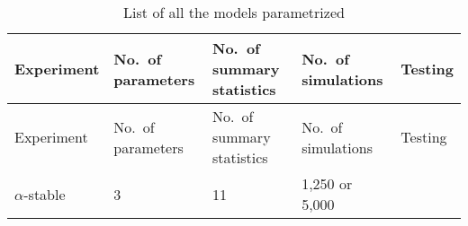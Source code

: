 \documentclass[]{article}
\begin{document}
\begin{longtable}[]{@{}lllll@{}}
\caption{\label{tab:experimentsmasterlist} List of all the models parametrized}\tabularnewline
\toprule
\begin{minipage}[b]{0.20\columnwidth}\raggedright
Experiment\strut
\end{minipage} & \begin{minipage}[b]{0.15\columnwidth}\raggedright
No.~of parameters\strut
\end{minipage} & \begin{minipage}[b]{0.21\columnwidth}\raggedright
No.~of summary statistics\strut
\end{minipage} & \begin{minipage}[b]{0.15\columnwidth}\raggedright
No.~of simulations\strut
\end{minipage} & \begin{minipage}[b]{0.15\columnwidth}\raggedright
Testing\strut
\end{minipage}\tabularnewline
\midrule
\endfirsthead
\toprule
\begin{minipage}[b]{0.20\columnwidth}\raggedright
Experiment\strut
\end{minipage} & \begin{minipage}[b]{0.15\columnwidth}\raggedright
No.~of parameters\strut
\end{minipage} & \begin{minipage}[b]{0.21\columnwidth}\raggedright
No.~of summary statistics\strut
\end{minipage} & \begin{minipage}[b]{0.15\columnwidth}\raggedright
No.~of simulations\strut
\end{minipage} & \begin{minipage}[b]{0.15\columnwidth}\raggedright
Testing\strut
\end{minipage}\tabularnewline
\midrule
\endhead
\begin{minipage}[t]{0.20\columnwidth}\raggedright
\(\alpha\)-stable\strut
\end{minipage} & \begin{minipage}[t]{0.15\columnwidth}\raggedright
3\strut
\end{minipage} & \begin{minipage}[t]{0.21\columnwidth}\raggedright
11\strut
\end{minipage} & \begin{minipage}[t]{0.15\columnwidth}\raggedright
1,250 or 5,000\strut
\end{minipage} & \begin{minipage}[t]{0.15\columnwidth}\raggedright

\end{minipage}
\end{longtable}
\end{document}
